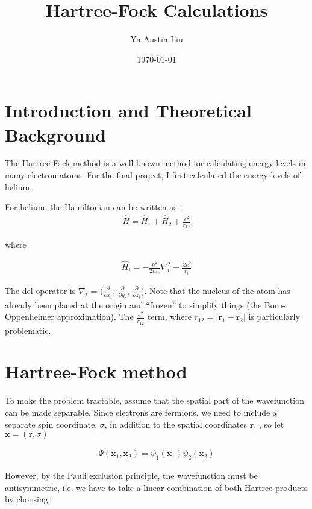 \documentclass[11pt,letterpaper]{article}
\begin{document}
\title{Hartree-Fock Calculations}
\author{Yu Austin Liu}
\date{\today}
\maketitle


\section{Introduction and Theoretical Background}
The Hartree-Fock method is a well known method for calculating energy levels
in many-electron atoms. For the final project, I first calculated
the energy levels of helium.

For helium, the Hamiltonian can be written as :
\begin{align}
\hat{H} = \hat{H}_1 + \hat{H}_2 + \frac{e^2}{r_{12}}
\end{align}

where 

\begin{align}
\hat{H}_i = -\frac{\hbar^2}{2m_e}\nabla_i^2 - \frac{Ze^2}{r_i}
\label{hamiltonian}
\end{align}

The del operator is
$\nabla_i$ = ($\frac{\partial}{\partial x_i}$, $\frac{\partial}{\partial y_i}$,
$\frac{\partial}{\partial z_i}$). Note that the nucleus of the
atom has already been placed at the origin and ``frozen'' to simplify things
(the Born-Oppenheimer approximation). The $\frac{e^2}{r_{12}}$ term, where
$r_{12} = |\mathbf{r}_1 - \mathbf{r}_2|$ is particularly problematic.

\section{Hartree-Fock method}

To make the problem tractable, assume that the spatial part of the wavefunction
can be made separable. Since electrons are fermions, 
we need to include a separate spin coordinate,
$\sigma$, in addition to the spatial coordinates $\mathbf{r}$,
, so let $\mathbf{x} = (\mathbf{r}, \sigma)$


\begin{align}
\Psi(\mathbf{x}_1,\mathbf{x}_2) = \psi_1(\mathbf{x}_1)\psi_2(\mathbf{x}_2)
\end{align}

However, by the Pauli exclusion principle, the wavefunction must be
antisymmetric, i.e. we have to take a linear combination of both
Hartree products by choosing:
\end{document}
